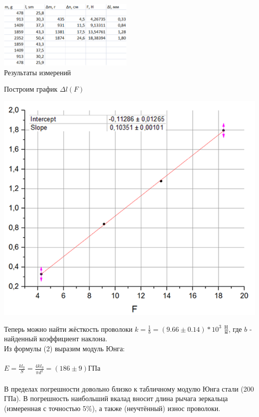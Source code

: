\documentclass[12pt]{article}
\begin{document}
	\begin{center}
		\includegraphics[width=6.5cm]{6_4} \\ Результаты измерений
	\end{center}
	Построим график $\Delta l(F)$
	\begin{center}
		\includegraphics[width=6.5in]{6_5}
	\end{center}
	Теперь можно найти жёсткость проволоки $k = \frac{1}{b} = (9.66 \pm 0.14) * 10^3$ $\frac{Н}{м}$, где $b$ - найденный коэффициент наклона.\\
	Из формулы (2) выразим модуль Юнга:\\ \\
	$E=\frac{kl_0}{S}=\frac{4kl_0}{\pi d^2} = (186 \pm 9) ГПа$\\ \\
	В пределах погрешности довольно близко к табличному модулю Юнга стали (200 ГПа). В погрешность наибольший вкалад вносит длина рычага зеркальца (измеренная с точностью 5\%), а также (неучтённый) износ проволоки.
\end{document}

